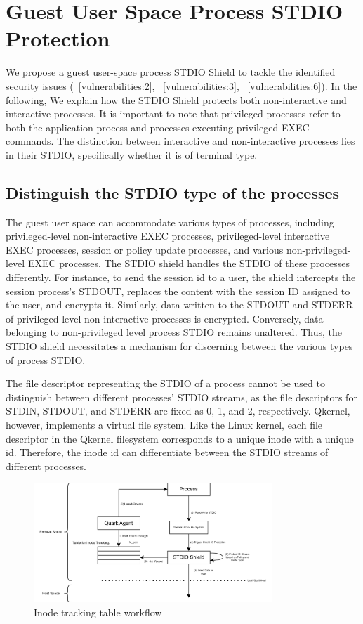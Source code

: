 \section{Guest User Space Process STDIO Protection}
\label{sec:design_STDIO_PROTECTION}
We propose a guest user-space process STDIO Shield to tackle the identified security issues (~\ref{vulnerabilities:2}, ~\ref{vulnerabilities:3}, ~\ref{vulnerabilities:6}). In the following, We explain how the STDIO Shield protects both non-interactive and interactive processes. It is important to note that privileged processes refer to 
both the application process and processes executing privileged EXEC commands. The distinction between interactive and non-interactive processes lies in their STDIO, specifically whether it is of terminal type. 


\subsection{Distinguish the STDIO type of the processes}

The guest user space can accommodate various types of processes, including privileged-level non-interactive EXEC processes, privileged-level interactive EXEC processes, session or policy update processes, and various non-privileged-level EXEC processes. The STDIO shield handles the STDIO of these processes differently. For instance, 
to send the session id to a user, the shield intercepts the session process's STDOUT, replaces the content with the session ID assigned to the user, and encrypts it. Similarly, data written to the STDOUT and STDERR of privileged-level non-interactive processes is encrypted. Conversely, data belonging 
to non-privileged level process STDIO remains unaltered. Thus, the STDIO shield necessitates a mechanism for discerning between the various types of process STDIO.
 
The file descriptor representing the STDIO of a process cannot be used to distinguish between different processes' STDIO streams, as the file descriptors for STDIN, STDOUT, and STDERR are fixed as 0, 1, and 2, respectively. Qkernel, however, implements a virtual file system. Like the Linux kernel, each file descriptor in the Qkernel filesystem corresponds to 
a unique inode with a unique id. Therefore, the inode id can differentiate between the STDIO streams of different processes.
\begin{figure}[!htb]
    \centering
    \includegraphics[width=0.8\textwidth]{images/differenciate_fds.png}
    \caption[Inode tracking table workflow]{Inode tracking table workflow}
    \label{fig:differenciate_fds}
\end{figure}
 
